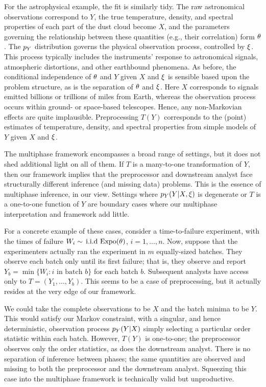 For the astrophysical example, the fit is similarly tidy.
The raw astronomical observations correspond to $Y$, the true temperature, density, and spectral properties of each part of the dust cloud become $X$, and the parameters governing the relationship between these quantities (e.g., their correlation) form $\theta$.
The $p_Y$ distribution governs the physical observation process, controlled by $\xi$.
This process typically includes the instruments' response to astronomical signals, atmospheric distortions, and other earthbound phenomena.
As before, the conditional independence of $\theta$ and $Y$ given $X$ and $\xi$ is sensible based upon the problem structure, as is the separation of $\theta$ and $\xi$. Here  $X$ corresponds to signals emitted billions or trillions of miles from Earth, whereas the observation process occurs within ground- or space-based telescopes.
Hence, any non-Markovian effects are quite implausible.
Preprocessing $T(Y)$ corresponds to the (point) estimates of temperature, density, and spectral properties from simple models of $Y$ given $X$ and $\xi$.

The multiphase framework encompasses a broad range of settings, but it does not shed additional light on all of them.
If $T$ is a many-to-one transformation of $Y$, then our framework implies that the preprocessor and downstream analyst face structurally  different inference (and missing data) problems.
This is the essence of multiphase inference, in our view.
Settings where $p_Y(Y|X, \xi)$ is degenerate or $T$ is a one-to-one function of $Y$ are boundary cases where our multiphase interpretation and framework add little.

For a concrete example of these cases, consider a time-to-failure experiment, with the times of failure $W_i \sim \,\mbox{i.i.d}\, \operatorname{Expo}(\theta)$, $i = 1, \ldots, n$.
Now, suppose that the experimenters actually ran the experiment in $m$ equally-sized batches.
They observe each batch only until its first failure; that is, they observe and report $Y_b = \min \{W_i : i \mbox{ in batch } b \}$ for each batch $b$.
Subsequent analysts have access only to $T = (Y_1, \ldots, Y_b)$.
This seems to be a case of preprocessing, but it actually resides at the very edge of our framework.

We could take the complete observations to be $X$ and the batch minima to be $Y$.
This would satisfy our Markov constraint, with a singular, and hence deterministic, observation process $p_Y(Y | X)$ simply selecting a particular order statistic within each batch.
However, $T(Y)$ is one-to-one; the preprocessor observes only the order statistics, as does the downstream analyst.
There is no separation of inference between phases; the same quantities are observed and missing to both the preprocessor and the downstream analyst.
Squeezing this case into the multiphase framework is technically valid but unproductive.

